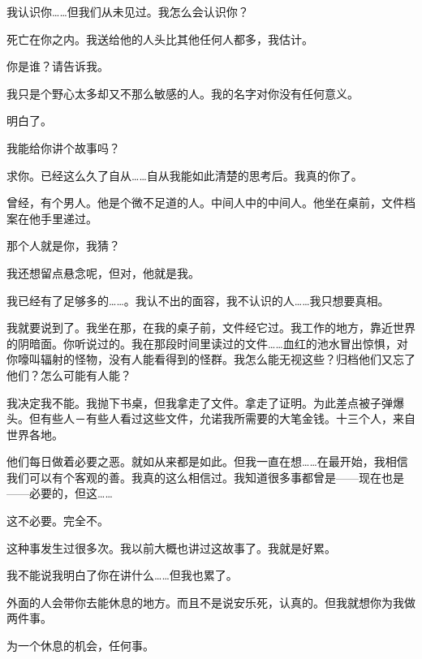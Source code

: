 我认识你……但我们从未见过。我怎么会认识你？

死亡在你之内。我送给他的人头比其他任何人都多，我估计。

你是谁？请告诉我。

我只是个野心太多却又不那么敏感的人。我的名字对你没有任何意义。

明白了。

我能给你讲个故事吗？


求你。已经这么久了自从……自从我能如此清楚的思考后。我真的你了。

曾经，有个男人。他是个微不足道的人。中间人中的中间人。他坐在桌前，文件档案在他手里递过。

那个人就是你，我猜？


我还想留点悬念呢，但对，他就是我。

我已经有了足够多的……。我认不出的面容，我不认识的人……我只想要真相。

我就要说到了。我坐在那，在我的桌子前，文件经它过。我工作的地方，靠近世界的阴暗面。你听说过的。我在那段时间里读过的文件……血红的池水冒出惊惧，对你嚎叫辐射的怪物，没有人能看得到的怪群。我怎么能无视这些？归档他们又忘了他们？怎么可能有人能？


我决定我不能。我抛下书桌，但我拿走了文件。拿走了证明。为此差点被子弹爆头。但有些人－有些人看过这些文件，允诺我所需要的大笔金钱。十三个人，来自世界各地。


他们每日做着必要之恶。就如从来都是如此。但我一直在想……在最开始，我相信我们可以有个客观的善。我真的这么相信过。我知道很多事都曾是——现在也是——必要的，但这……


这不必要。完全不。


这种事发生过很多次。我以前大概也讲过这故事了。我就是好累。

我不能说我明白了你在讲什么……但我也累了。

外面的人会带你去能休息的地方。而且不是说安乐死，认真的。但我就想你为我做两件事。

为一个休息的机会，任何事。

